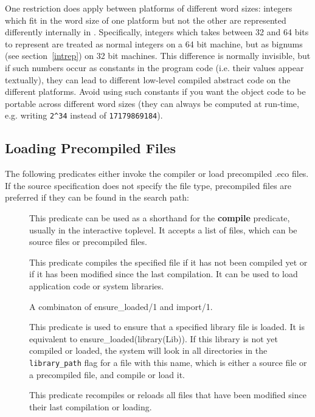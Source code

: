 One restriction does apply between platforms of different
word sizes: integers which fit in the word size of one platform
but not the other are represented differently internally in {\eclipse}. 
Specifically, integers which takes between 32 and 64
bits to represent are treated as normal integers on a 64 bit machine,
but as bignums (see section~\ref{intrep}) on 32 bit machines. This
difference is normally invisible, but if
such numbers occur as constants in the program code (i.e. their values appear
textually), they can lead to different low-level compiled abstract code on
the different platforms. Avoid using such constants if you want
the object code to be portable across different word sizes (they can always
be computed at run-time, e.g. writing \verb'2^34' instead of {\tt 17179869184}).



\subsection{Loading Precompiled Files}
The following predicates either invoke the compiler or load precompiled .eco files.
If the source specification does not specify the file type, precompiled files
are preferred if they can be found in the search path:
\begin{description}
\item[]
This predicate can be used as a shorthand for the {\bf compile} predicate,
usually in the interactive toplevel.
It accepts a list of files, which can be source files or precompiled files.

\item[]
This predicate compiles the specified file if it has not been compiled
yet or if it has been modified since the last compilation.
It can be used to load application code or system libraries.

\item[]
A combinaton of ensure_loaded/1 and import/1.

\item[]
This predicate is used to ensure that a specified library file is loaded.
It is equivalent to ensure_loaded(library(Lib)).
If this library is not yet compiled or loaded, the system will look
in all directories in the {\tt library_path} flag for a file with this name,
which is either a source file or a precompiled file, and compile or load it.

\item[]
This predicate recompiles or reloads all files that have been modified
since their last compilation or loading.
\end{description}

